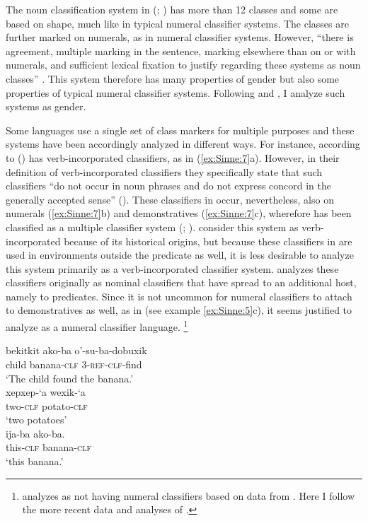 \documentclass[output=collectionpaper]{langsci/langscibook}
\begin{document}
The noun classification system in  (; ) has more than 12 classes and some are based on shape, much like in typical numeral classifier systems. The classes are further marked on numerals, as in numeral classifier systems. However, ``there is agreement, multiple marking in the sentence, marking elsewhere than on or with numerals, and sufficient lexical fixation to justify regarding these systems as noun classes'' \citep[136]{Nichols1992}. This system therefore has many properties of gender but also some properties of typical numeral classifier systems. Following \citet{Nichols1992} and \citet{Corbett2013}, I analyze such systems as gender.

Some languages use a single set of class markers for multiple purposes and these systems have been accordingly analyzed in different ways. For instance, according to \citet[261]{Derbyshire1990}  () has verb\hyp{}incorporated classifiers, as in (\ref{ex:Sinne:7}a). However, in their definition of verb-incorporated classifiers they specifically state that such classifiers ``do not occur in noun phrases and do not express concord in the generally accepted sense'' (\citealt[245]{Derbyshire1990}). These classifiers in  occur, nevertheless, also on numerals (\ref{ex:Sinne:7}b) and demonstratives (\ref{ex:Sinne:7}c), wherefore  has been classified as a multiple classifier system (\citealt{Aikhenvald2000}; \citealt{Passer2016a}). \citet{Derbyshire1990} consider this system as verb-incorporated because of its historical origins, but because these classifiers in  are used in environments outside the predicate as well, it is less desirable to analyze this system primarily as a verb-incorporated classifier system. \citet{Passer2016a} analyzes these classifiers originally as nominal classifiers that have spread to an additional host, namely to predicates. Since it is not uncommon for numeral classifiers to attach to demonstratives as well, as in  (see example \ref{ex:Sinne:5}c), it seems justified to analyze  as a numeral classifier language.%
\footnote{\citet{Gil2013} analyzes  as not having numeral classifiers based on data from \citet{Derbyshire1990}. Here I follow the more recent data and analyses of \citet{Passer2016a}.}

\ea
\label{ex:Sinne:7}
\begin{xlist}
\ex
\gll bekitkit ako-ba o'-su-ba-dobuxik\\
child banana-\textsc{clf} \textsc{3-ref-clf}{}-find \\
\glt `The child found the banana.'\\
\ex
\gll xepxep-`a wexik-`a\\
two-\textsc{clf} potato-\textsc{clf} \\
\glt `two potatoes'\\
\ex
\gll ija-ba ako-ba.\\
this-\textsc{clf} banana-\textsc{clf}\\
\glt `this banana.'\\
\end{xlist}
\z
\end{document}
